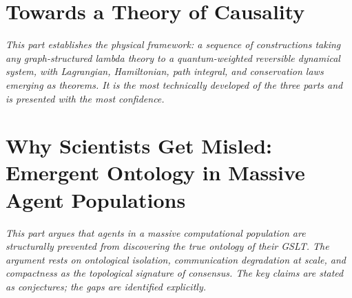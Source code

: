 \documentclass[12pt]{article}
\theoremstyle{remark}
\begin{document}
\tableofcontents
\newpage


\part{Towards a Theory of Causality}

\vspace{1em}
\begin{mdframed}[backgroundcolor=remarkgray, linecolor=gray!60,
                 linewidth=1pt, topline=false, rightline=false,
                 bottomline=false]
\small\itshape
This part establishes the physical framework: a sequence of
constructions taking any graph-structured lambda theory to a
quantum-weighted reversible dynamical system, with Lagrangian,
Hamiltonian, path integral, and conservation laws emerging as
theorems.
It is the most technically developed of the three parts and is
presented with the most confidence.
\end{mdframed}
\vspace{1em}




\part{Why Scientists Get Misled:\\Emergent Ontology in Massive Agent Populations}

\vspace{1em}
\begin{mdframed}[backgroundcolor=remarkgray, linecolor=gray!60,
                 linewidth=1pt, topline=false, rightline=false,
                 bottomline=false]
\small\itshape
This part argues that agents in a massive computational population
are structurally prevented from discovering the true ontology of
their GSLT.
The argument rests on ontological isolation, communication
degradation at scale, and compactness as the topological signature
of consensus.
The key claims are stated as conjectures; the gaps are identified
explicitly.
\end{mdframed}
\vspace{1em}
\end{document}

